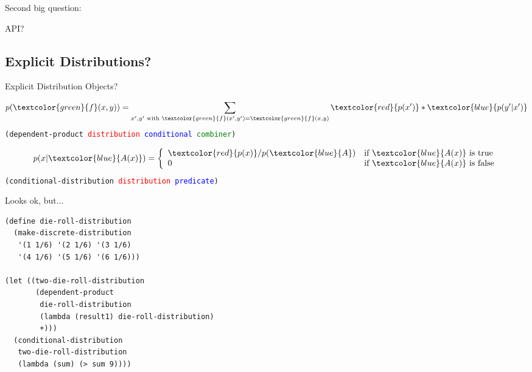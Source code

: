 \documentclass{beamer}
\newcommand{\code}[1]{\texttt{#1}}
\newcommand{\startor}{\left\{ \begin{array}{ll}}
\newcommand{\stopor}{\end{array} \right.}
\newcommand{\green}[1]{\textcolor{green}{#1}}
\newcommand{\red}[1]{\textcolor{red}{#1}}
\newcommand{\blue}[1]{\textcolor{blue}{#1}}
\begin{document}
\begin{frame}
\begin{center}
\Huge Second big question:
\end{center}
\end{frame}

\begin{frame}
\begin{center}
\Huge API?
\end{center}
\end{frame}

\subsection{Explicit Distributions?}

\begin{frame}
\begin{center}
\Huge Explicit Distribution Objects?
\end{center}
\end{frame}

\begin{frame}

  \[ p(\green{f}(x, y)) = \sum_{x', y' \textrm{ with } \green{f}(x', y') = \green{f}(x, y)} \red{p(x')} * \blue{p(y'|x')} \]
  \code{(dependent-product \red{distribution} \blue{conditional} \green{combiner})}

\[ p(x|\blue{A(x)}) = \startor
\red{p(x)} / p(\blue{A}) & \textrm{if $\blue{A(x)}$ is true} \\
0 &                        \textrm{if $\blue{A(x)}$ is false} \\
\stopor \]
  \code{(conditional-distribution \red{distribution} \blue{predicate})}

\end{frame}

\begin{frame}
\begin{center}
\Huge Looks ok, but...
\end{center}
\end{frame}

\begin{frame}[fragile=singleslide]
\begin{verbatim}
(define die-roll-distribution
  (make-discrete-distribution
   '(1 1/6) '(2 1/6) '(3 1/6)
   '(4 1/6) '(5 1/6) '(6 1/6)))

(let ((two-die-roll-distribution
       (dependent-product
        die-roll-distribution
        (lambda (result1) die-roll-distribution)
        +)))
  (conditional-distribution
   two-die-roll-distribution
   (lambda (sum) (> sum 9))))
\end{verbatim}
\end{frame}
\end{document}
